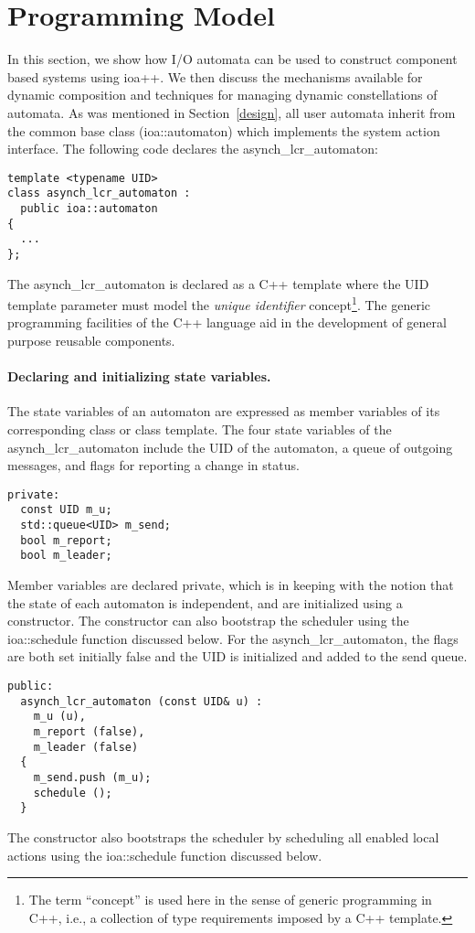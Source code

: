 \section{Programming Model\label{programming_model}}

In this section, we show how I/O automata can be used to construct component based systems using ioa++.
We then discuss the mechanisms available for dynamic composition and techniques for managing dynamic constellations of automata.
As was mentioned in Section~\ref{design}, all user automata inherit from the common base class (ioa::automaton) which implements the system action interface.
\ifjournal
The following code declares the asynch\_lcr\_automaton:
\begin{lstlisting}
template <typename UID>
class asynch_lcr_automaton :
  public ioa::automaton
{
  ...
};
\end{lstlisting}
The asynch\_lcr\_automaton is declared as a C++ template where the UID template parameter must model the \emph{unique identifier} concept\footnote{The term ``concept'' is used here in the sense of generic programming in C++, i.e., a collection of type requirements imposed by a C++ template.}.
The generic programming facilities of the C++ language aid in the development of general purpose reusable components.

\paragraph*{Declaring and initializing state variables.}
\fi
The state variables of an automaton are expressed as member variables of its corresponding class or class template.
\ifjournal
The four state variables of the asynch\_lcr\_automaton include the UID of the automaton, a queue of outgoing messages, and flags for reporting a change in status.
\begin{lstlisting}
private:
  const UID m_u;
  std::queue<UID> m_send;
  bool m_report;
  bool m_leader;
\end{lstlisting}
\fi
Member variables are declared private, which is in keeping with the notion that the state of each automaton is independent, and are initialized using a constructor.
The constructor can also bootstrap the scheduler using the ioa::schedule function discussed below.
\ifjournal
For the asynch\_lcr\_automaton, the flags are both set initially false and the UID is initialized and added to the send queue.
\begin{lstlisting}
public:
  asynch_lcr_automaton (const UID& u) :
    m_u (u),
    m_report (false),
    m_leader (false)
  {
    m_send.push (m_u);
    schedule ();
  }
\end{lstlisting}
The constructor also bootstraps the scheduler by scheduling all enabled local actions using the ioa::schedule function discussed below.
\fi

